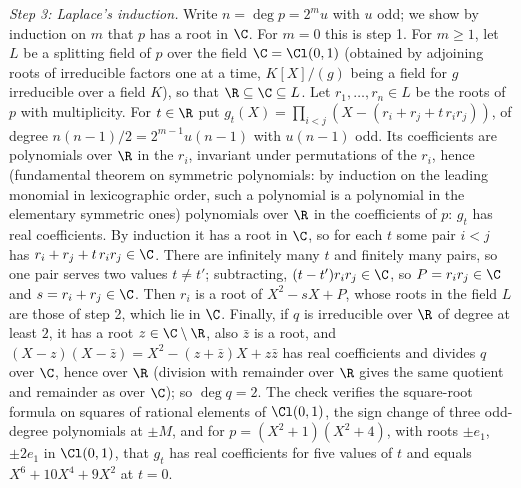 \emph{Step 3: Laplace's induction.} Write $n = \deg p = 2^{m}u$ with $u$ odd; we show by induction on $m$ that $p$ has a root in $\C$. For $m = 0$ this is step 1. For $m \ge 1$, let $L$ be a splitting field of $p$ over the field $\C = \Cl(0,1)$ (obtained by adjoining roots of irreducible factors one at a time, $K[X]/(g)$ being a field for $g$ irreducible over a field $K$), so that $\R \subseteq \C \subseteq L$. Let $r_{1}, \dots, r_{n} \in L$ be the roots of $p$ with multiplicity. For $t \in \R$ put $g_{t}(X) = \prod_{i<j}(X - (r_{i} + r_{j} + t\,r_{i}r_{j}))$, of degree $n(n-1)/2 = 2^{m-1}u(n - 1)$ with $u(n - 1)$ odd. Its coefficients are polynomials over $\R$ in the $r_{i}$, invariant under permutations of the $r_{i}$, hence (fundamental theorem on symmetric polynomials: by induction on the leading monomial in lexicographic order, such a polynomial is a polynomial in the elementary symmetric ones) polynomials over $\R$ in the coefficients of $p$: $g_{t}$ has real coefficients. By induction it has a root in $\C$, so for each $t$ some pair $i < j$ has $r_{i} + r_{j} + t\,r_{i}r_{j} \in \C$. There are infinitely many $t$ and finitely many pairs, so one pair serves two values $t \ne t'$; subtracting, $(t - t')r_{i}r_{j} \in \C$, so $P = r_{i}r_{j} \in \C$ and $s = r_{i} + r_{j} \in \C$. Then $r_{i}$ is a root of $X^{2} - sX + P$, whose roots in the field $L$ are those of step 2, which lie in $\C$. Finally, if $q$ is irreducible over $\R$ of degree at least $2$, it has a root $z \in \C \setminus \R$, also $\bar{z}$ is a root, and $(X - z)(X - \bar{z}) = X^{2} - (z + \bar{z})X + z\bar{z}$ has real coefficients and divides $q$ over $\C$, hence over $\R$ (division with remainder over $\R$ gives the same quotient and remainder as over $\C$); so $\deg q = 2$. The check verifies the square-root formula on squares of rational elements of $\Cl(0,1)$, the sign change of three odd-degree polynomials at $\pm M$, and for $p = (X^{2} + 1)(X^{2} + 4)$, with roots $\pm e_{1}$, $\pm 2e_{1}$ in $\Cl(0,1)$, that $g_{t}$ has real coefficients for five values of $t$ and equals $X^{6} + 10X^{4} + 9X^{2}$ at $t = 0$.

